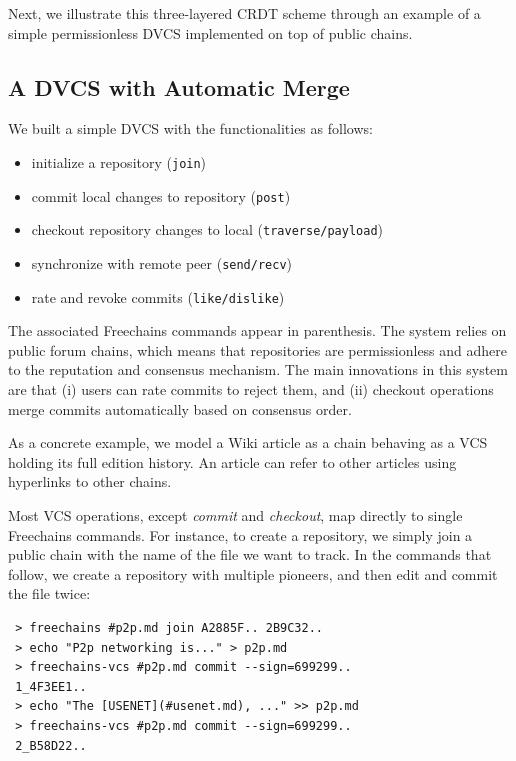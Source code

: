 \documentclass[10pt,journal,compsoc]{IEEEtran}
\newcommand{\FC}       {Freechains\xspace}
\begin{document}
Next, we illustrate this three-layered CRDT scheme through an example of a
simple permissionless DVCS implemented on top of public chains.

\newpage
\subsection{A DVCS with Automatic Merge}

We built a simple DVCS with the functionalities as follows:
%
\begin{itemize}
    \setlength{\itemindent}{-8pt}
    \item initialize a repository (\texttt{\scriptsize{join}})
    \item commit local changes to repository (\texttt{\scriptsize{post}})
    \item checkout repository changes to local (\texttt{\scriptsize{traverse/payload}})
    \item synchronize with remote peer (\texttt{\scriptsize{send/recv}})
    \item rate and revoke commits (\texttt{\scriptsize{like/dislike}})
\end{itemize}
%
The associated \FC commands appear in parenthesis.
%
The system relies on public forum chains, which means that repositories are
permissionless and adhere to the reputation and consensus mechanism.
The main innovations in this system are that
    (i)  users can rate commits to reject them, and
    (ii) checkout operations merge commits automatically based on consensus order.

As a concrete example, we model a Wiki article as a chain behaving as a VCS
holding its full edition history.
An article can refer to other articles using hyperlinks to other chains.

Most VCS operations, except \emph{commit} and \emph{checkout}, map directly to
single \FC commands.
For instance, to create a repository, we simply join a public chain with the
name of the file we want to track.
In the commands that follow, we create a repository with multiple pioneers, and
then edit and commit the file twice:

{\footnotesize
\begin{verbatim}
 > freechains #p2p.md join A2885F.. 2B9C32..
 > echo "P2p networking is..." > p2p.md
 > freechains-vcs #p2p.md commit --sign=699299..
 1_4F3EE1..
 > echo "The [USENET](#usenet.md), ..." >> p2p.md
 > freechains-vcs #p2p.md commit --sign=699299..
 2_B58D22..
\end{verbatim}
}
\end{document}
